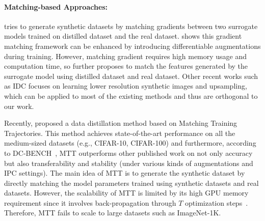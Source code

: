 \documentclass[10pt,twocolumn,letterpaper]{article}
\begin{document}
\paragraph{Matching-based Approaches:}
\cite{zhaodc} tries to generate synthetic datasets by matching gradients between two surrogate models trained on distilled dataset and the real dataset. 
\cite{zhaodsa} shows this gradient matching framework can be enhanced by introducing  differentiable augmentations during training. However, matching gradient requires high memory usage and computation time, so 
%
\cite{zhaodm} further proposes to match the features generated by the surrogate model using distilled dataset and real dataset.
Other recent works \cite{pmlr-v162-kim22c,deng2022remember,lee2022dataset} such as IDC focuses on learning lower resolution synthetic images and upsampling, which can be applied to most of the existing methods and thus are orthogonal to our work.

Recently, \cite{cazenavette2022dataset} proposed a data distillation method based 
 on Matching Training Trajectories. This method achieves state-of-the-art performance on all the medium-sized datasets (e.g., CIFAR-10, CIFAR-100) and furthermore, according to DC-BENCH~\cite{dcbench}, MTT outperforms other published work on not only accuracy but also transferability and stability (under various kinds of augmentations and IPC settings). The main idea of MTT is to generate the synthetic dataset by directly matching the model parameters trained using synthetic datasets and real datasets. However, the scalability of MTT is limited by its high GPU memory requirement since it involves back-propagation through $T$ optimization steps~\cite{dcbench, zhou2022dataset}. Therefore, MTT fails to scale to large datasets such as ImageNet-1K. \\
\end{document}

